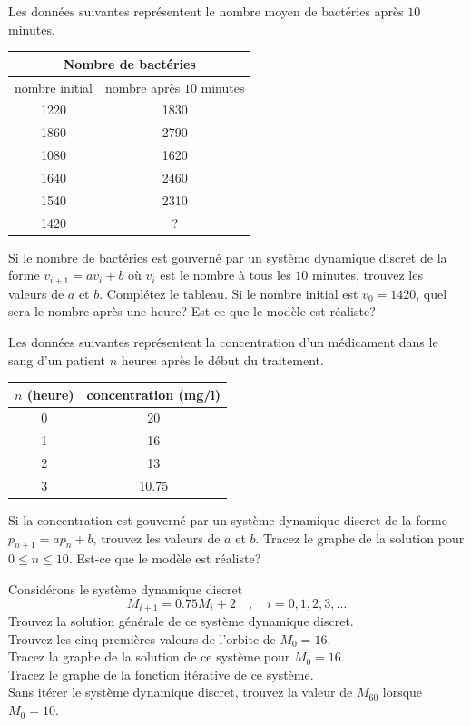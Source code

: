 \begin{question}[\life]
Les données suivantes représentent le nombre moyen de bactéries après
$10$ minutes.
\begin{center}
\begin{tabular}{c|c}
\multicolumn{2}{c}{Nombre de bactéries} \\
\hline
nombre initial & nombre après $10$ minutes \\
\hline
1220 & 1830 \\
1860 & 2790 \\
1080 & 1620 \\
1640 & 2460 \\
1540 & 2310 \\
1420 & ?
\end{tabular}
\end{center}
Si le nombre de bactéries est gouverné par un système dynamique
discret de la forme $v_{i+1} = a v_i + b$ où $v_i$ est le nombre à
tous les $10$ minutes, trouvez les valeurs de $a$ et $b$.  Complétez
le tableau.  Si le nombre initial est $v_0 = 1420$, quel sera le
nombre après une heure?  Est-ce que le modèle est réaliste?
\label{6Q78}
\end{question}

\begin{question}[\life]
Les données suivantes représentent la concentration d'un médicament dans le
sang d'un patient $n$ heures après le début du traitement.
\begin{center}
\begin{tabular}{c|c}
$n$ (heure) & concentration (mg/l) \\
\hline
0 & 20 \\
1 & 16 \\
2 & 13 \\
3 & 10.75
\end{tabular}
\end{center}
Si la concentration est gouverné par un système dynamique discret de
la forme $p_{n+1} = a p_n + b$, trouvez les valeurs de $a$ et $b$.  Tracez le
graphe de la solution pour $0 \leq n \leq 10$.  Est-ce que le modèle est
réaliste?
\label{6Q79}
\end{question}

\begin{question}[\life]
Considérons le système dynamique discret
\begin{equation}\label{sdd18}
M_{i+1} = 0.75 M_i + 2  \quad , \quad i=0, 1, 2, 3, \ldots
\end{equation}
 Trouvez la solution générale de ce système dynamique discret.\\
 Trouvez les cinq premières valeurs de l'orbite de $M_0 = 16$.\\
 Tracez la graphe de la solution de ce système pour $M_0 = 16$.\\
 Tracez le graphe de la fonction itérative de ce système.\\
 Sans itérer le système dynamique discret, trouvez la valeur
de $M_{60}$ lorsque $M_0 = 10$.
\label{6Q80}
\end{question}

